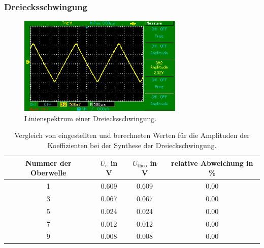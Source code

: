 \subsubsection{Dreiecksschwingung}
\begin{figure}
  \centering
  \includegraphics[width=0.7\textwidth]{dreieck.png}
  \caption{Linienspektrum einer Dreiecksschwingung.}
  \label{fig:dreieck_synthese}
\end{figure}
\begin{table}
  \centering
  \begin{tabular}{c c c c}
    \toprule
    Nummer der Oberwelle & $U_\text{e}$ in \si{\volt} &
    $U_\text{theo}$ in \si{\volt} & relative Abweichung in \% \\
    \midrule
    1 & 0.609 & 0.609 & 0.00 \\
    3 & 0.067 & 0.067 & 0.00 \\
    5 & 0.024 & 0.024 & 0.00 \\
    7 & 0.012 & 0.012 & 0.00 \\
    9 & 0.008 & 0.008 & 0.00 \\
    \bottomrule
  \end{tabular}
  \caption{Vergleich von eingestellten und berechneten Werten für die Amplituden
    der Koeffizienten bei der Synthese der Dreieckschwingung.}
  \label{tab:synthese_dreieck}
\end{table}
